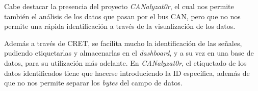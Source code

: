 Cabe destacar la presencia del proyecto \emph{CANalyzat0r}\cite{ canalyzator:can}, el cual nos permite también el análisis de los datos que pasan por el bus CAN, pero que no nos permite una rápida identificación a través de la visualización de los datos. 

Además a través de CRET, se facilita mucho la identificación de las señales, pudiendo etiquetarlas y almacenarlas en el \emph{dashboard}, y a su vez en una base de datos, para su utilización más adelante. En \emph{CANalyzat0r}, el etiquetado de los datos identificados tiene que hacerse introduciendo la ID específica, además de que no nos permite separar los \emph{bytes} del campo de datos.
